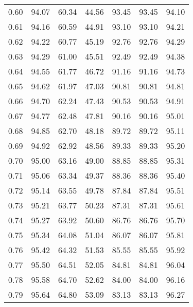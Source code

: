 \begin{tabular}{|c|c|c|c|c|c|c|}
      0.60 &     94.07 &     60.34 &      44.56 &   93.45 &      93.45 &         94.10 \\
      0.61 &     94.16 &     60.59 &      44.91 &   93.10 &      93.10 &         94.21 \\
      0.62 &     94.22 &     60.77 &      45.19 &   92.76 &      92.76 &         94.29 \\
      0.63 &     94.29 &     61.00 &      45.51 &   92.49 &      92.49 &         94.38 \\
      0.64 &     94.55 &     61.77 &      46.72 &   91.16 &      91.16 &         94.73 \\
      0.65 &     94.62 &     61.97 &      47.03 &   90.81 &      90.81 &         94.81 \\
      0.66 &     94.70 &     62.24 &      47.43 &   90.53 &      90.53 &         94.91 \\
      0.67 &     94.77 &     62.48 &      47.81 &   90.16 &      90.16 &         95.01 \\
      0.68 &     94.85 &     62.70 &      48.18 &   89.72 &      89.72 &         95.11 \\
      0.69 &     94.92 &     62.92 &      48.56 &   89.33 &      89.33 &         95.20 \\
      0.70 &     95.00 &     63.16 &      49.00 &   88.85 &      88.85 &         95.31 \\
      0.71 &     95.06 &     63.34 &      49.37 &   88.36 &      88.36 &         95.40 \\
      0.72 &     95.14 &     63.55 &      49.78 &   87.84 &      87.84 &         95.51 \\
      0.73 &     95.21 &     63.77 &      50.23 &   87.31 &      87.31 &         95.61 \\
      0.74 &     95.27 &     63.92 &      50.60 &   86.76 &      86.76 &         95.70 \\
      0.75 &     95.34 &     64.08 &      51.04 &   86.07 &      86.07 &         95.81 \\
      0.76 &     95.42 &     64.32 &      51.53 &   85.55 &      85.55 &         95.92 \\
      0.77 &     95.50 &     64.51 &      52.05 &   84.81 &      84.81 &         96.04 \\
      0.78 &     95.58 &     64.70 &      52.62 &   84.00 &      84.00 &         96.16 \\
      0.79 &     95.64 &     64.80 &      53.09 &   83.13 &      83.13 &         96.27 \\

\end{tabular}
